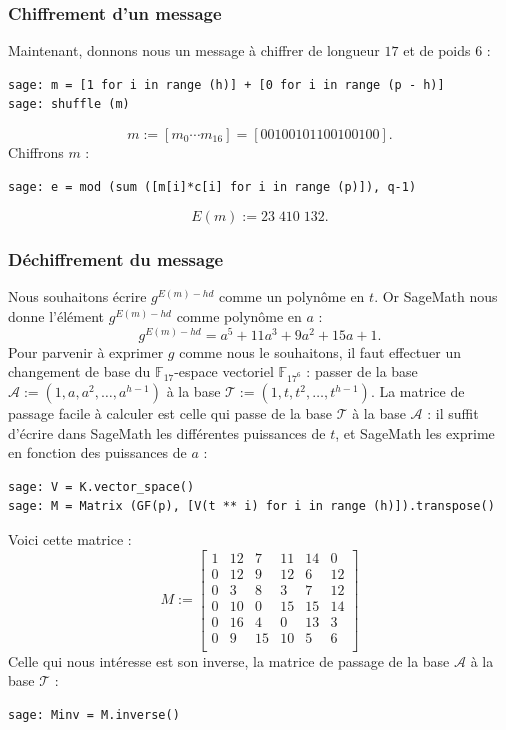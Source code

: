 \documentclass[a4paper, titlepage, 11pt]{article}
\theoremstyle{definition}
\theoremstyle{remark}
\def\gf #1{\mathbb{F}_{#1}}
\begin{document}
\subsubsection{Chiffrement d'un message}
Maintenant, donnons nous un message à chiffrer de longueur $17$ et de poids $6$ :
\begin{verbatim}
sage: m = [1 for i in range (h)] + [0 for i in range (p - h)]
sage: shuffle (m)
\end{verbatim}
$$m := [m_0\cdots m_{16}] = [00100101100100100].$$
Chiffrons $m$ :
\begin{verbatim}
sage: e = mod (sum ([m[i]*c[i] for i in range (p)]), q-1)
\end{verbatim}
$$E(m) := 23\;410\;132.$$

\subsubsection{Déchiffrement du message}
Nous souhaitons écrire $g^{E(m) - hd}$ comme un polynôme en $t$. Or SageMath nous donne l'élément $g^{E(m) - hd}$ comme polynôme en $a$ : $$g^{E(m) - hd} = a^5 + 11a^3 + 9a^2 + 15a + 1.$$
Pour parvenir à exprimer $g$ comme nous le souhaitons, il faut effectuer un changement de base du $\gf{17}$-espace vectoriel $\gf{17^6}$ : passer de la base $\mathcal{A} := (1, a, a^2, \dots, a^{h-1})$ à la base $\mathcal{T} := (1, t, t^2, \dots, t^{h-1})$.
La matrice de passage facile à calculer est celle qui passe de la base $\mathcal{T}$ à la base $\mathcal{A}$ : il suffit d'écrire dans SageMath les différentes puissances de $t$, et SageMath les exprime en fonction des puissances de $a$ :
\begin{verbatim}
sage: V = K.vector_space()
sage: M = Matrix (GF(p), [V(t ** i) for i in range (h)]).transpose()
\end{verbatim}
Voici cette matrice :
$$M := \left[\begin{array}{cccccc}
1 & 12 & 7 & 11 & 14 & 0 \\
0 & 12 & 9 & 12 & 6 & 12 \\
0 & 3 & 8 & 3 & 7 & 12 \\
0 & 10 & 0 & 15 & 15 & 14 \\
0 & 16 & 4 & 0 & 13 & 3 \\
0 & 9 & 15 & 10 & 5 & 6 \\
\end{array}\right]$$
Celle qui nous intéresse est son inverse, la matrice de passage de la base $\mathcal{A}$ à la base $\mathcal{T}$ :
\begin{verbatim}
sage: Minv = M.inverse()
\end{verbatim}
\end{document}
